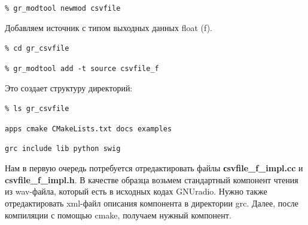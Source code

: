 \documentclass[10pt, a5paper]{article}
\begin{document}
\verb!% gr_modtool newmod csvfile!

Добавляем источник с типом выходных данных float (f).

\verb!% cd gr_csvfile!

\verb!% gr_modtool add -t source csvfile_f!

Это создает структуру директорий:

\verb!% ls gr_csvfile!

\verb!apps cmake CMakeLists.txt docs examples!

\verb!grc include lib python swig!

Нам в первую очередь потребуется отредактировать файлы \textbf{сsv\-file\_f\_impl.cc} и \textbf{csvfile\_f\_impl.h}. В качестве образца возьмем стандартный компонент чтения из wav-файла, который есть в исходных кодах GNUradio. Нужно также отредактировать xml-файл описания компонента в директории grc. Далее, после компиляции с помощью cmake, получаем нужный компонент.
\end{document}
